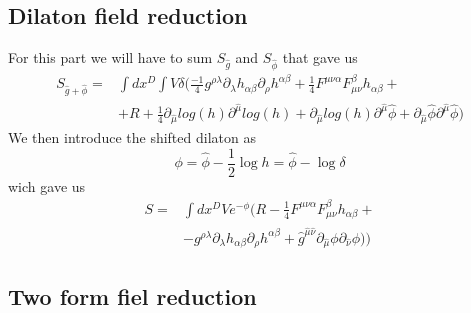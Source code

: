 \documentclass{article}
\begin{document}
\subsection{Dilaton field reduction}
For this part we will have to sum $S_{\hat g}$ and $S_{\hat \phi}$ that gave us
    \begin{equation*}
    \begin{aligned}
    S_{\hat g + \hat \phi} = &\int d x^D \int V \delta( 
    \frac{-1}{4} g^{\rho \lambda} \partial_\lambda h_{\alpha \beta}\partial_\rho h^{\alpha \beta}
    +\frac{1}{4}F^{\mu \nu \alpha}F^{\beta}_{\mu  \nu}h_{\alpha \beta}+\\
    &+ R + \frac{1}{4} \partial_{\hat \mu} log(h) \partial^{\hat \mu} log(h) + \partial_{\hat \mu} log(h) \partial^{\hat \mu} \hat \phi + \partial_{\hat \mu} \hat \phi \partial^{\hat \mu} \hat \phi )
\end{aligned}
\end{equation*}
We then introduce the shifted dilaton as 
\begin{equation}
    \phi = \hat \phi -\frac{1}{2} \log{h}= \hat \phi - \log{\delta}
\end{equation}
wich gave us
\begin{equation}
    \begin{aligned}
    S = &\int d x^D V e^{- \phi}(
    R -\frac{1}{4}F^{\mu \nu \alpha}F^{\beta}_{\mu  \nu}h_{\alpha \beta}+\\
    &- g^{\rho \lambda} \partial_\lambda h_{\alpha \beta}\partial_\rho h^{\alpha \beta}
    +\hat g^{\hat \mu  \hat \nu } \partial_{\hat \mu}\phi\partial_{\hat \nu}\phi)
    )
\end{aligned}
\end{equation} 
\subsection{Two form fiel reduction}
\end{document}
